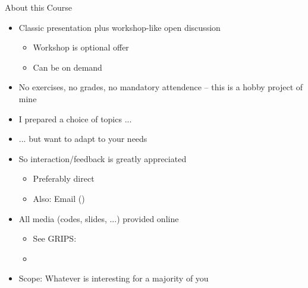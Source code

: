 
\begin{frame}{About this Course}
%
\begin{itemize}
\item Classic presentation plus workshop-like open discussion
	\begin{itemize}
	\item Workshop is optional offer
	\item Can be on demand
	\end{itemize}
\item No exercises, no grades, no mandatory attendence -- this is a hobby project of mine
\item I prepared a choice of topics ...
\item ... but want to adapt to your needs
\item So interaction/feedback is greatly appreciated
	\begin{itemize}
	\item Preferably direct
	\item Also: Email ()
	\end{itemize}
\item All media (codes, slides, ...) provided online
	\begin{itemize}
	\item See GRIPS: 
	\item {}
	\end{itemize}
\item Scope: Whatever is interesting for a majority of you
\end{itemize}
%
\end{frame}


